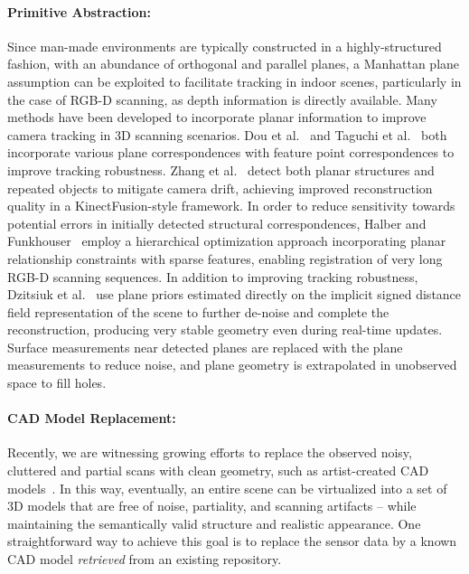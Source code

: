 \paragraph*{Primitive Abstraction:} Since man-made environments are typically constructed in a highly-structured fashion, with an abundance of orthogonal and parallel planes, a Manhattan plane assumption can be exploited to facilitate tracking in indoor scenes, particularly in the case of RGB-D scanning, as depth information is directly available.
Many methods have been developed to incorporate planar information to improve camera tracking in 3D scanning scenarios.
Dou et al.~\cite{dou2012exploring} and Taguchi et al.~\cite{taguchi2013point} both incorporate various plane correspondences with feature point correspondences to improve tracking robustness.
Zhang et al.~\cite{zhang2015online} detect both planar structures and repeated objects to mitigate camera drift, achieving improved reconstruction quality in a KinectFusion-style framework.
In order to reduce sensitivity towards potential errors in initially detected structural correspondences, Halber and Funkhouser~\cite{halber2016fine} employ a hierarchical optimization approach incorporating planar relationship constraints with sparse features, enabling registration of very long RGB-D scanning sequences.
In addition to improving tracking robustness, Dzitsiuk et al.~\cite{dzitsiuk2016noising} use plane priors estimated directly on the implicit signed distance field representation of the scene to further de-noise and complete the reconstruction, producing very stable geometry even during real-time updates.
Surface measurements near detected planes are replaced with the plane measurements to reduce noise, and plane geometry is extrapolated in unobserved space to fill holes.

\paragraph*{CAD Model Replacement:} Recently, we are witnessing growing efforts to replace the observed noisy, cluttered and partial scans with clean geometry, such as artist-created CAD models~\cite{Li:2015,Avetisyan:2019,Avetisyan:2019:Scan2CAD,Dahnert:2019}. In this way, eventually, an entire scene can be virtualized into a set of 3D models that are free of noise, partiality, and scanning artifacts -- while maintaining the semantically valid structure and realistic appearance. One straightforward way to achieve this goal is to replace the sensor data by a known CAD model \textit{retrieved} from an existing repository.

